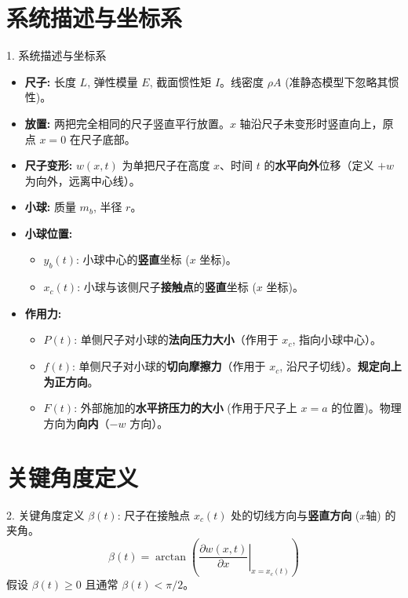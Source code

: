 \documentclass{beamer}
\begin{document}
\section{系统描述与坐标系}
\begin{frame}{1. 系统描述与坐标系}
    \begin{itemize}
        \item \textbf{尺子:} 长度 $L$, 弹性模量 $E$, 截面惯性矩 $I$。线密度 $\rho A$ (准静态模型下忽略其惯性)。
        \item \textbf{放置:} 两把完全相同的尺子竖直平行放置。$x$ 轴沿尺子未变形时竖直向上，原点 $x=0$ 在尺子底部。
        \item \textbf{尺子变形:} $w(x, t)$ 为单把尺子在高度 $x$、时间 $t$ 的\textbf{水平向外}位移（定义 $+w$ 为向外，远离中心线）。
        \item \textbf{小球:} 质量 $m_b$, 半径 $r$。
        \item \textbf{小球位置:}
            \begin{itemize}
                \item $y_b(t)$: 小球中心的\textbf{竖直}坐标 ($x$ 坐标)。
                \item $x_c(t)$: 小球与该侧尺子\textbf{接触点}的\textbf{竖直}坐标 ($x$ 坐标)。
            \end{itemize}
        \item \textbf{作用力:}
            \begin{itemize}
                \item $P(t)$: 单侧尺子对小球的\textbf{法向压力大小}（作用于 $x_c$, 指向小球中心）。
                \item $f(t)$: 单侧尺子对小球的\textbf{切向摩擦力}（作用于 $x_c$, 沿尺子切线）。\textbf{规定向上为正方向}。
                \item $F(t)$: 外部施加的\textbf{水平挤压力的大小} (作用于尺子上 $x=a$ 的位置)。物理方向为\textbf{向内}（$-w$ 方向）。
            \end{itemize}
    \end{itemize}
\end{frame}

\section{关键角度定义}
\begin{frame}{2. 关键角度定义}
    $\beta(t)$: 尺子在接触点 $x_c(t)$ 处的切线方向与\textbf{竖直方向} ($x$轴) 的夹角。
    \begin{equation*}
        \beta(t) = \arctan\left( \left. \frac{\partial w(x,t)}{\partial x} \right|_{x=x_c(t)} \right)
    \end{equation*}
    假设 $\beta(t) \ge 0$ 且通常 $\beta(t) < \pi/2$。
\end{frame}
\end{document}
